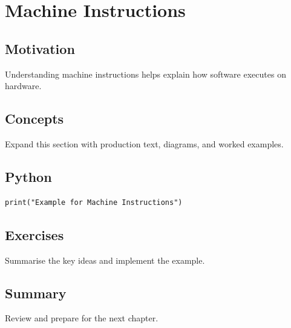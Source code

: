\chapter{Machine Instructions}
\label{chap:29}



\section{Motivation}
Understanding machine instructions helps explain how software executes on hardware.

\section{Concepts}
Expand this section with production text, diagrams, and worked examples.

\section{Python}
\begin{lstlisting}
print("Example for Machine Instructions")
\end{lstlisting}

\section{Exercises}
\begin{exercise}
Summarise the key ideas and implement the example.
\end{exercise}

\section{Summary}
Review and prepare for the next chapter.
